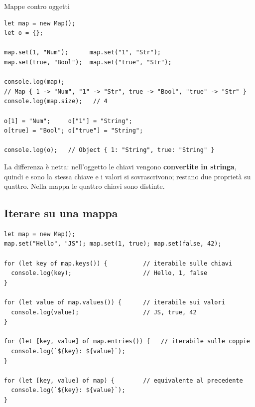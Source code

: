 \begin{esempio}{Mappe contro oggetti}
\begin{affianco}[0.55][c]
\codicepiccolo
\begin{lstlisting}[style=js, name=mappe.js]
let map = new Map();
let o = {};

map.set(1, "Num");      map.set("1", "Str");
map.set(true, "Bool");  map.set("true", "Str");

console.log(map);
// Map { 1 -> "Num", "1" -> "Str", true -> "Bool", "true" -> "Str" }
console.log(map.size);   // 4

o[1] = "Num";     o["1"] = "String";
o[true] = "Bool"; o["true"] = "String";

console.log(o);   // Object { 1: "String", true: "String" }
\end{lstlisting}
\risultato
\begin{immagine}
\end{immagine}
\end{affianco}

La differenza è netta: nell'oggetto le chiavi vengono \textbf{convertite in
stringa}, quindi  e  sono la stessa chiave e i valori si
sovrascrivono; restano due proprietà su quattro. Nella mappa le quattro chiavi
sono distinte.
\end{esempio}

\subsection{Iterare su una mappa}

\begin{lstlisting}[style=js, name=iterazione-mappe.js]
let map = new Map();
map.set("Hello", "JS"); map.set(1, true); map.set(false, 42);

for (let key of map.keys()) {          // iterabile sulle chiavi
  console.log(key);                    // Hello, 1, false
}

for (let value of map.values()) {      // iterabile sui valori
  console.log(value);                  // JS, true, 42
}

for (let [key, value] of map.entries()) {   // iterabile sulle coppie
  console.log(`${key}: ${value}`);
}

for (let [key, value] of map) {        // equivalente al precedente
  console.log(`${key}: ${value}`);
}
\end{lstlisting}

